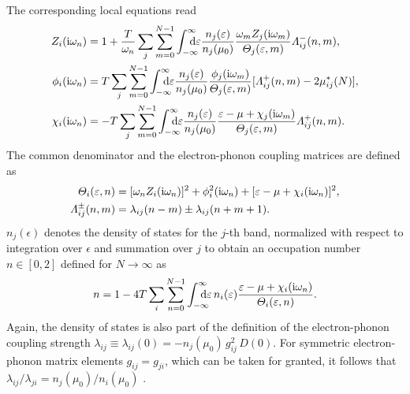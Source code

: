 The corresponding local  equations read
%
\begin{subequations} \label{local multi-band Eliashberg equations}
    \begin{align}
        Z_i(\I \omega_n) &= 1 + \frac T {\omega_n} \sum_j \sum_{m = 0}^{N - 1}
        \int \from{-\infty} \till \infty \D \epsilon
        \frac{n_j(\epsilon)}{n_j(\mu_0)}
        \frac{\omega_m Z_j(\I \omega_m)}{\Theta_j(\epsilon, m)}
        \Lambda_{i j}^-(n, m),
        \\
        \phi_i(\I \omega_n) &= T \sum_j \sum_{m = 0}^{N - 1}
        \int \from{-\infty} \till \infty \D \epsilon
        \frac{n_j(\epsilon)}{n_j(\mu_0)}
        \frac{\phi_j(\I \omega_m)}{\Theta_j(\epsilon, m)}
        [\Lambda_{i j}^+(n, m) - 2 \mu^*_{i j}(N)],
        \\
        \chi_i(\I \omega_n) &= -T \sum_j \sum_{m = 0}^{N - 1}
        \int \from{-\infty} \till \infty \D \epsilon
        \frac{n_j(\epsilon)}{n_j(\mu_0)}
        \frac{\epsilon - \mu + \chi_j(\I \omega_m)}{\Theta_j(\epsilon, m)}
        \Lambda_{i j}^+(n, m).
    \end{align}
\end{subequations}
%
The common denominator and the electron-phonon coupling matrices are defined as
%
\begin{align*}
    \varTheta_i(\varepsilon, n) &= [\omega_n Z_i(\mathrm i \omega_n)]^2
    + \phi_i^2(\mathrm i \omega_n) + [\varepsilon - \mu + \chi_i(\mathrm i \omega_n)]^2,
    \\
    \varLambda_{i j}^\pm(n, m)
    &= \lambda_{i j}(n - m) \pm \lambda_{i j}(n + m + 1).
\end{align*}
%
$n_j(\epsilon)$ denotes the density of states for the $j$-th band, normalized
with respect to integration over $\epsilon$ and summation over $j$ to obtain
an occupation number $n \in [0, 2]$ defined for $N \rightarrow \infty$ as
%
\begin{equation*}
    n = 1 - 4 T \sum_i \sum_{n = 0}^{N - 1}
    \int \from{-\infty} \till \infty \D \epsilon \, n_i(\epsilon)
    \frac{\epsilon - \mu + \chi_i(\I \omega_n)}{\Theta_i(\epsilon, n)}.
\end{equation*}
%
Again, the density of states is also part of the definition of the
electron-phonon coupling strength $\lambda_{i j} \equiv \lambda_{i j}(0) =
-n_j(\mu_0) \, g_{i j}^2 \, D(0)$. For symmetric electron-phonon matrix elements
$g_{i j} = g_{j i}$, which can be taken for granted, it follows that $\lambda_{i
j} / \lambda_{j i} = n_j(\mu_0) / n_i(\mu_0)$ \cite[Eq.~3.64]{Galasso05}.

